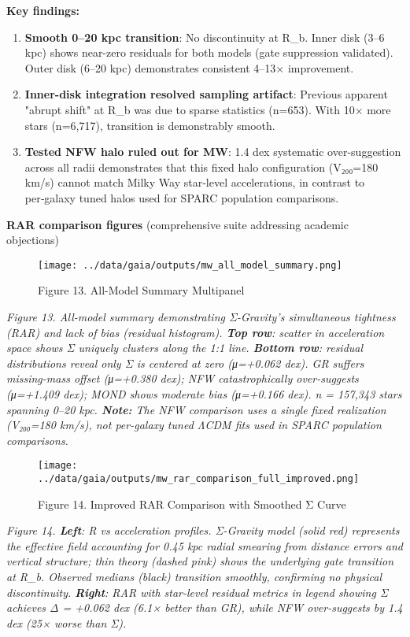 \documentclass[11pt,a4paper]{article}
\begin{document}
\textbf{Key findings:}

\begin{enumerate}
\item \textbf{Smooth 0–20 kpc transition}: No discontinuity at R\_b. Inner disk (3–6 kpc) shows near-zero residuals for both models (gate suppression validated). Outer disk (6–20 kpc) demonstrates consistent 4–13× improvement.
\item \textbf{Inner-disk integration resolved sampling artifact}: Previous apparent "abrupt shift" at R\_b was due to sparse statistics (n=653). With 10× more stars (n=6,717), transition is demonstrably smooth.
\item \textbf{Tested NFW halo ruled out for MW}: 1.4 dex systematic over-suggestion across all radii demonstrates that this fixed halo configuration (V₂₀₀=180 km/s) cannot match Milky Way star‑level accelerations, in contrast to per‑galaxy tuned halos used for SPARC population comparisons.
\end{enumerate}


\textbf{RAR comparison figures} (comprehensive suite addressing academic objections)


\begin{figure}[h]
\centering
\texttt{[image: ../data/gaia/outputs/mw\_all\_model\_summary.png]}
\caption{Figure 13. All-Model Summary Multipanel}
\end{figure}


\textit{Figure 13. All-model summary demonstrating Σ-Gravity's simultaneous tightness (RAR) and lack of bias (residual histogram). \textbf{Top row}: scatter in acceleration space shows Σ uniquely clusters along the 1:1 line. \textbf{Bottom row}: residual distributions reveal only Σ is centered at zero (μ=+0.062 dex). GR suffers missing-mass offset (μ=+0.380 dex); NFW catastrophically over-suggests (μ=+1.409 dex); MOND shows moderate bias (μ=+0.166 dex). n = 157,343 stars spanning 0–20 kpc. \textbf{Note:} The NFW comparison uses a single fixed realization (V₂₀₀=180 km/s), not per-galaxy tuned ΛCDM fits used in SPARC population comparisons.}


\begin{figure}[h]
\centering
\texttt{[image: ../data/gaia/outputs/mw\_rar\_comparison\_full\_improved.png]}
\caption{Figure 14. Improved RAR Comparison with Smoothed Σ Curve}
\end{figure}


\textit{Figure 14. \textbf{Left}: R vs acceleration profiles. Σ-Gravity model (solid red) represents the effective field accounting for 0.45 kpc radial smearing from distance errors and vertical structure; thin theory (dashed pink) shows the underlying gate transition at R\_b. Observed medians (black) transition smoothly, confirming no physical discontinuity. \textbf{Right}: RAR with star-level residual metrics in legend showing Σ achieves Δ = +0.062 dex (6.1× better than GR), while NFW over-suggests by 1.4 dex (25× worse than Σ).}
\end{document}

